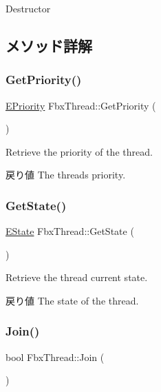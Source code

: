 Destructor 



\subsection{メソッド詳解}
\mbox{\label{class_fbx_thread_a6c7859fdc523e2a4628931a0daf139d0}} 
\subsubsection{\texorpdfstring{Get\+Priority()}{GetPriority()}}
{\footnotesize\ttfamily \hyperlink{class_fbx_thread_a1b7d46235dd8589e03f7a29777f083f2}{E\+Priority} Fbx\+Thread\+::\+Get\+Priority (\begin{DoxyParamCaption}{ }\end{DoxyParamCaption})}

Retrieve the priority of the thread. \begin{DoxyReturn}{戻り値}
The thread\textquotesingle{}s priority. 
\end{DoxyReturn}
\mbox{\label{class_fbx_thread_a49873956e4054a30dc7e5cc5766b74ca}} 
\subsubsection{\texorpdfstring{Get\+State()}{GetState()}}
{\footnotesize\ttfamily \hyperlink{class_fbx_thread_a82f55f0fc5f947d4357c8175d05782ff}{E\+State} Fbx\+Thread\+::\+Get\+State (\begin{DoxyParamCaption}{ }\end{DoxyParamCaption})}

Retrieve the thread current state. \begin{DoxyReturn}{戻り値}
The state of the thread. 
\end{DoxyReturn}
\mbox{\label{class_fbx_thread_a784d4eb2cd3ca88f9f9283c1488467fa}} 
\subsubsection{\texorpdfstring{Join()}{Join()}}
{\footnotesize\ttfamily bool Fbx\+Thread\+::\+Join (\begin{DoxyParamCaption}{ }\end{DoxyParamCaption})}

